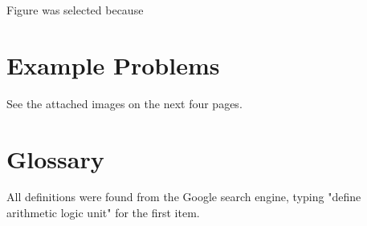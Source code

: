 \documentclass[12pt]{article}
\begin{document}
Figure was selected because


\section{Example Problems}

See the attached images on the next four pages.

% 

\section{Glossary}

All definitions were found from the Google search engine, typing "define arithmetic logic unit" for the first item.
\end{document}

